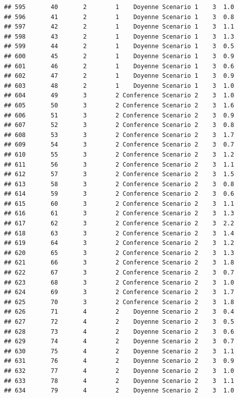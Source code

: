 \documentclass[
]{article}
\begin{document}
\begin{verbatim}
## 595       40       2        1    Doyenne Scenario 1    3  1.0
## 596       41       2        1    Doyenne Scenario 1    3  0.8
## 597       42       2        1    Doyenne Scenario 1    3  1.1
## 598       43       2        1    Doyenne Scenario 1    3  1.3
## 599       44       2        1    Doyenne Scenario 1    3  0.5
## 600       45       2        1    Doyenne Scenario 1    3  0.9
## 601       46       2        1    Doyenne Scenario 1    3  0.6
## 602       47       2        1    Doyenne Scenario 1    3  0.9
## 603       48       2        1    Doyenne Scenario 1    3  1.0
## 604       49       3        2 Conference Scenario 2    3  1.0
## 605       50       3        2 Conference Scenario 2    3  1.6
## 606       51       3        2 Conference Scenario 2    3  0.9
## 607       52       3        2 Conference Scenario 2    3  0.8
## 608       53       3        2 Conference Scenario 2    3  1.7
## 609       54       3        2 Conference Scenario 2    3  0.7
## 610       55       3        2 Conference Scenario 2    3  1.2
## 611       56       3        2 Conference Scenario 2    3  1.1
## 612       57       3        2 Conference Scenario 2    3  1.5
## 613       58       3        2 Conference Scenario 2    3  0.8
## 614       59       3        2 Conference Scenario 2    3  0.6
## 615       60       3        2 Conference Scenario 2    3  1.1
## 616       61       3        2 Conference Scenario 2    3  1.3
## 617       62       3        2 Conference Scenario 2    3  2.2
## 618       63       3        2 Conference Scenario 2    3  1.4
## 619       64       3        2 Conference Scenario 2    3  1.2
## 620       65       3        2 Conference Scenario 2    3  1.3
## 621       66       3        2 Conference Scenario 2    3  1.8
## 622       67       3        2 Conference Scenario 2    3  0.7
## 623       68       3        2 Conference Scenario 2    3  1.0
## 624       69       3        2 Conference Scenario 2    3  1.7
## 625       70       3        2 Conference Scenario 2    3  1.8
## 626       71       4        2    Doyenne Scenario 2    3  0.4
## 627       72       4        2    Doyenne Scenario 2    3  0.5
## 628       73       4        2    Doyenne Scenario 2    3  0.6
## 629       74       4        2    Doyenne Scenario 2    3  0.7
## 630       75       4        2    Doyenne Scenario 2    3  1.1
## 631       76       4        2    Doyenne Scenario 2    3  0.9
## 632       77       4        2    Doyenne Scenario 2    3  1.0
## 633       78       4        2    Doyenne Scenario 2    3  1.1
## 634       79       4        2    Doyenne Scenario 2    3  1.0

\end{verbatim}
\end{document}

